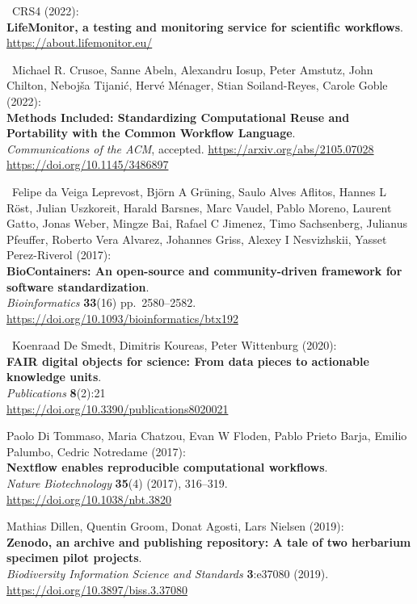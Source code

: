 \begin{thebibliography}{9}
~CRS4 (2022):\\
\textbf{LifeMonitor, a testing and monitoring service for scientific
workflows}.\\
\url{https://about.lifemonitor.eu/}

~Michael R. Crusoe, Sanne Abeln, Alexandru Iosup, Peter Amstutz,
John Chilton, Nebojša Tijanić, Hervé Ménager, Stian Soiland-Reyes,
Carole Goble (2022):\\
\textbf{Methods Included: Standardizing Computational Reuse and
Portability with the Common Workflow Language}.\\
\emph{Communications of the ACM}, accepted.
\url{https://arxiv.org/abs/2105.07028}\\
\url{https://doi.org/10.1145/3486897}

~Felipe da Veiga Leprevost, Björn A Grüning, Saulo Alves
Aflitos, Hannes L Röst, Julian Uszkoreit, Harald Barsnes, Marc Vaudel,
Pablo Moreno, Laurent Gatto, Jonas Weber, Mingze Bai, Rafael C Jimenez,
Timo Sachsenberg, Julianus Pfeuffer, Roberto Vera Alvarez, Johannes
Griss, Alexey I Nesvizhskii, Yasset Perez-Riverol (2017):\\
\textbf{BioContainers: An open-source and community-driven framework for
software standardization}.\\
\emph{Bioinformatics} \textbf{33}(16) pp.~2580--2582.\\
\url{https://doi.org/10.1093/bioinformatics/btx192}

~Koenraad De Smedt, Dimitris Koureas, Peter Wittenburg (2020):\\
\textbf{FAIR digital objects for science: From data pieces to actionable
knowledge units}.\\
\emph{Publications} \textbf{8}(2):21\\
\url{https://doi.org/10.3390/publications8020021}

 Paolo Di Tommaso, Maria Chatzou, Evan W Floden, Pablo Prieto
Barja, Emilio Palumbo, Cedric Notredame (2017):\\
\textbf{Nextflow enables reproducible computational workflows}.\\
\emph{Nature Biotechnology} \textbf{35}(4) (2017), 316--319.\\
\url{https://doi.org/10.1038/nbt.3820}

 Mathias Dillen, Quentin Groom, Donat Agosti, Lars Nielsen
(2019):\\
\textbf{Zenodo, an archive and publishing repository: A tale of two
herbarium specimen pilot projects}.\\
\emph{Biodiversity Information Science and Standards} \textbf{3}:e37080
(2019).\\
\url{https://doi.org/10.3897/biss.3.37080}


\end{thebibliography}
